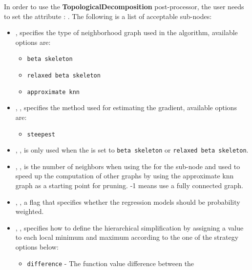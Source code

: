 In order to use the \textbf{TopologicalDecomposition} post-processor, the user
needs to set the attribute :
.
The following is a list of acceptable sub-nodes:
\begin{itemize}
  \item {} , specifies the type
  of neighborhood graph used in the algorithm, available options are:
  \begin{itemize}
    \item \texttt{beta skeleton}
    \item \texttt{relaxed beta skeleton}
    \item \texttt{approximate knn}
  \end{itemize}
  \item {}, , specifies the
  method used for estimating the gradient, available options are:
  \begin{itemize}
    \item \texttt{steepest}
  \end{itemize}
  \item {}, \xmlDesc{float in the range: (0,2], optional field}, is
  only used when the  is set to \texttt{beta skeleton} or
  \texttt{relaxed beta skeleton}.
  \item {}, , is the number of
  neighbors when using the  for the 
  sub-node and used to speed up the computation of other graphs by using the
  approximate knn graph as a starting point for pruning. -1 means use a fully
  connected graph.
  \item {}, , a flag that specifies
  whether the regression models should be probability weighted.
  \item {}, , specifies how
  to define the hierarchical simplification by assigning a value to each local
  minimum and maximum according to the one of the strategy options below:
  \begin{itemize}
    \item \texttt{difference} - The function value difference between the

\end{itemize}
\end{itemize}
